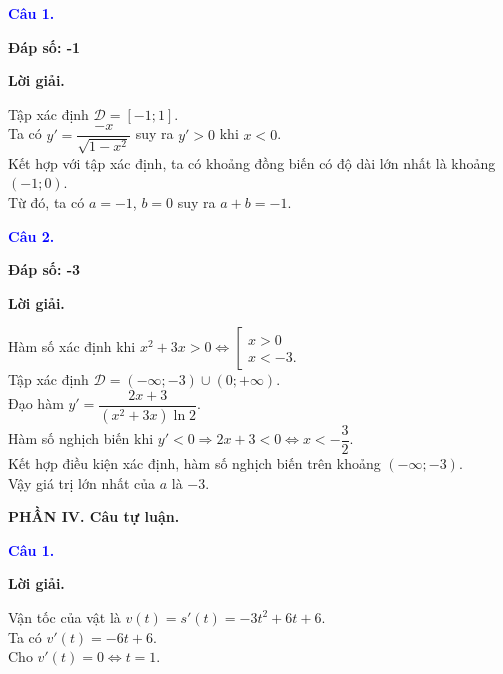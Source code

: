 \documentclass[12pt,a4paper]{article}
\begin{document}
\medskip

\noindent\textcolor{blue}{\textbf{Câu 1.}}

\noindent \textbf{Đáp số: -1}

\noindent\textbf{Lời giải.}

Tập xác định $\mathscr{D}=[-1;1]$.\\

 Ta có $y'=\dfrac{-x}{\sqrt{1-x^2}}$ suy ra $y'>0$ khi $x<0$.\\

 Kết hợp với tập xác định, ta có khoảng đồng biến có độ dài lớn nhất là khoảng $(-1;0)$.\\

 Từ đó, ta có $a=-1$, $b=0$ suy ra $a+b=-1$.

\medskip
\noindent\textcolor{blue}{\textbf{Câu 2.}}

\noindent \textbf{Đáp số: -3}

\noindent\textbf{Lời giải.}

Hàm số xác định khi $x^2+3x>0\Leftrightarrow \left[\begin{array}{l}x>0\\x<-3.\end{array}\right.$\\

		Tập xác định $\mathscr{D}=(-\infty;-3)\cup(0;+\infty)$.\\

		Đạo hàm $y'=\dfrac{2x+3}{(x^2+3x)\ln 2}$.\\

		Hàm số nghịch biến khi $y'<0\Rightarrow 2x+3<0\Leftrightarrow x<-\dfrac{3}{2}$.\\

		Kết hợp điều kiện xác định, hàm số nghịch biến trên khoảng $(-\infty;-3)$.\\

		Vậy giá trị lớn nhất của $a$ là $-3$.

\medskip
\noindent\textbf{PHẦN IV. Câu tự luận.}

\medskip

\noindent\textcolor{blue}{\textbf{Câu 1.}}

\noindent\textbf{Lời giải.}

Vận tốc của vật là $v(t)=s'(t)=-3t^2+6t+6$.\\

		Ta có $v'(t)=-6t+6$.\\

		Cho $v'(t)=0\Leftrightarrow t=1$.\\
\end{document}
